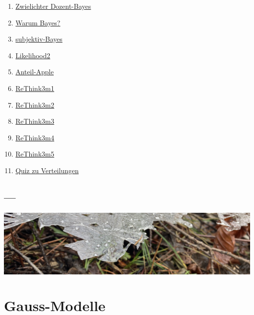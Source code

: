 \documentclass[
  a4paper,
  DIV=11]{scrreprt}
\providecommand{\tightlist}{%
  \setlength{\itemsep}{0pt}\setlength{\parskip}{0pt}}\usepackage{longtable,booktabs,array}
\theoremstyle{definition}
\theoremstyle{remark}
\begin{document}
\begin{enumerate}
\def\labelenumi{\arabic{enumi}.}
\tightlist
\item
  \href{https://datenwerk.netlify.app/posts/zwielichter-dozent-bayes/zwielichter-dozent-bayes}{Zwielichter
  Dozent-Bayes}
\item
  \href{https://datenwerk.netlify.app/posts/warum-bayes/warum-bayes}{Warum
  Bayes?}
\item
  \href{https://datenwerk.netlify.app/posts/subjektiv-bayes/subjektiv-bayes}{subjektiv-Bayes}
\item
  \href{https://datenwerk.netlify.app/posts/likelihood2/likelihood2}{Likelihood2}
\item
  \href{https://datenwerk.netlify.app/posts/anteil-apple/anteil-apple}{Anteil-Apple}
\item
  \href{https://datenwerk.netlify.app/posts/rethink3m1/rethink3m1}{ReThink3m1}
\item
  \href{https://datenwerk.netlify.app/posts/rethink3m2/rethink3m2}{ReThink3m2}
\item
  \href{https://datenwerk.netlify.app/posts/rethink3m3/rethink3m3}{ReThink3m3}
\item
  \href{https://datenwerk.netlify.app/posts/rethink3m4/rethink3m4}{ReThink3m4}
\item
  \href{https://datenwerk.netlify.app/posts/rethink3m5/rethink3m5}{ReThink3m5}
\item
  \href{https://datenwerk.netlify.app/\#category=Verteilungen-Quiz}{Quiz
  zu Verteilungen}
\end{enumerate}

\hypertarget{section-6}{%
\section{---}\label{section-6}}

\includegraphics[width=1\textwidth,height=\textheight]{./img/outro-07.jpg}


\hypertarget{gauss-modelle}{%
\chapter{Gauss-Modelle}\label{gauss-modelle}}
\end{document}
